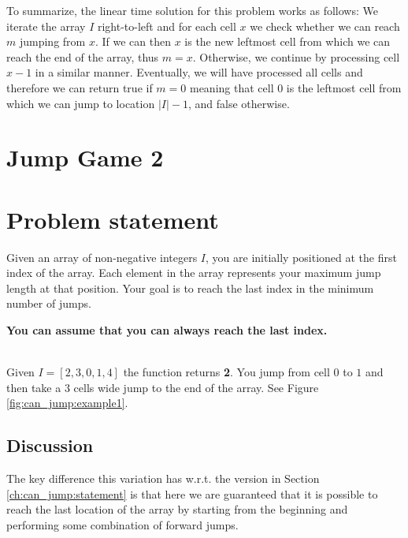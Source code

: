 To summarize,  the linear time solution for this problem works as follows: We iterate the array $I$
right-to-left and for each cell $x$ we check whether we can reach $m$ jumping from $x$. If we can
then $x$ is the new leftmost cell from which we can reach the end of the array, thus $m = x$.
Otherwise, we continue by processing cell $x-1$ in a similar manner. Eventually, we will have
processed all cells and therefore we can return true if $m = 0$ meaning that cell $0$ is the
leftmost cell from which we can jump to location $|I|-1$, and false otherwise.



\section{Jump Game 2}

\section{Problem statement}
\label{can_jump1:sec:statement}
\begin{exercise}
    Given an array of non-negative integers $I$, you are initially positioned at the first index of the array.
    Each element in the array represents your maximum jump length at that position.
    Your goal is to reach the last index in the minimum number of jumps.    
    
    \textbf{You can assume that you can always reach the last index.}
    \begin{example}
        \hfill \\
        Given  $I=[2,3,0,1,4]$ the function returns \textbf{2}. You jump from cell $0$ to $1$ and
        then take a $3$ cells wide jump to the end of the array. See Figure
        \ref{fig:can_jump:example1}.
        \label{ex:can_jump2_example1}
    \end{example}
\end{exercise}

\subsection{Discussion}
The key difference this variation has w.r.t. the version in Section \ref{ch:can_jump:statement} is that here we are guaranteed that it is possible to reach the last location of the array by starting from the beginning and performing some combination of forward jumps. 

